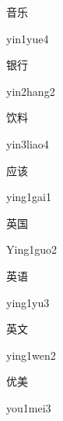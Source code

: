 \begin{multicols*}{2}
\begin{verbete}{音乐}
\begin{pronuncia}{yin1yue4}
\end{pronuncia}
\end{verbete}

\begin{verbete}{银行}
\begin{pronuncia}{yin2hang2}
\end{pronuncia}
\end{verbete}

\begin{verbete}{饮料}
\begin{pronuncia}{yin3liao4}
\end{pronuncia}
\end{verbete}

\begin{verbete}{应该}
\begin{pronuncia}{ying1gai1}
\end{pronuncia}
\end{verbete}

\begin{verbete}{英国}
\begin{pronuncia}{Ying1guo2}
\end{pronuncia}
\end{verbete}

\begin{verbete}[ying1yu3]{英语}
\begin{pronuncia}{ying1yu3}
\end{pronuncia}
\end{verbete}

\begin{verbete}{英文}
\begin{pronuncia}{ying1wen2}
\end{pronuncia}
\end{verbete}

\begin{verbete}{优美}
\begin{pronuncia}{you1mei3}
\end{pronuncia}
\end{verbete}


\end{multicols*}

